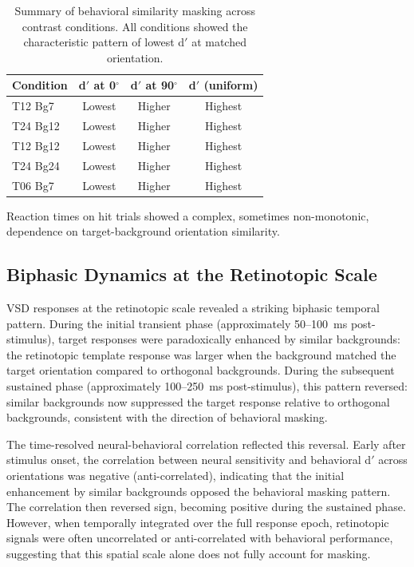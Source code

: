 \documentclass[11pt]{article}
\begin{document}
\begin{table}[ht]
\centering
\caption{Summary of behavioral similarity masking across contrast conditions. All conditions showed the characteristic pattern of lowest d$'$ at matched orientation.}
\label{tab:behavior}
\begin{tabular}{lccc}
\toprule
Condition & d$'$ at 0$^{\circ}$ & d$'$ at 90$^{\circ}$ & d$'$ (uniform) \\
\midrule
T12 Bg7  & Lowest & Higher & Highest \\
T24 Bg12 & Lowest & Higher & Highest \\
T12 Bg12 & Lowest & Higher & Highest \\
T24 Bg24 & Lowest & Higher & Highest \\
T06 Bg7  & Lowest & Higher & Highest \\
\bottomrule
\end{tabular}
\end{table}

Reaction times on hit trials showed a complex, sometimes non-monotonic, dependence on target-background orientation similarity.

\subsection{Biphasic Dynamics at the Retinotopic Scale}

VSD responses at the retinotopic scale revealed a striking biphasic temporal pattern. During the initial transient phase (approximately 50--100~ms post-stimulus), target responses were paradoxically enhanced by similar backgrounds: the retinotopic template response was larger when the background matched the target orientation compared to orthogonal backgrounds. During the subsequent sustained phase (approximately 100--250~ms post-stimulus), this pattern reversed: similar backgrounds now suppressed the target response relative to orthogonal backgrounds, consistent with the direction of behavioral masking.

The time-resolved neural-behavioral correlation reflected this reversal. Early after stimulus onset, the correlation between neural sensitivity and behavioral d$'$ across orientations was negative (anti-correlated), indicating that the initial enhancement by similar backgrounds opposed the behavioral masking pattern. The correlation then reversed sign, becoming positive during the sustained phase. However, when temporally integrated over the full response epoch, retinotopic signals were often uncorrelated or anti-correlated with behavioral performance, suggesting that this spatial scale alone does not fully account for masking.
\end{document}
